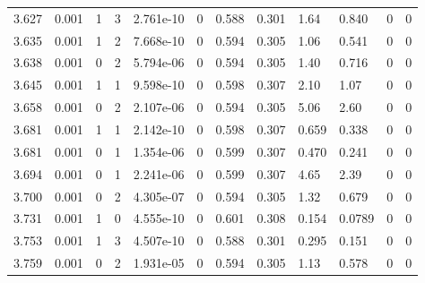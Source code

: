 \documentclass[preview]{standalone}
\begin{document}
{{{{{{{{\begin{tabular}{L{1.2cm}C{1.2cm} C{0.3cm}C{0.5cm} C{1.4cm}C{1.4cm} C{1.4cm}C{1.4cm} C{1.6cm}C{1.6cm} C{1.6cm}C{1.6cm}}
  3.627  &  0.001  & 1     &  3 &  2.761e-10  & 0  &  0.588&   0.301& 1.64 & 0.840   &  0 & 0  \\ 
  3.635  &  0.001  & 1     &  2 &  7.668e-10  & 0  &  0.594&   0.305& 1.06 & 0.541   &  0 & 0  \\ 
  3.638  &  0.001  & 0     &  2 &  5.794e-06  & 0  &  0.594&   0.305& 1.40 & 0.716   &  0 & 0  \\ 
  3.645  &  0.001  & 1     &  1 &  9.598e-10  & 0  &  0.598&   0.307& 2.10 & 1.07   &  0 & 0  \\ 
  3.658  &  0.001  & 0     &  2 &  2.107e-06  & 0  &  0.594&   0.305& 5.06 & 2.60   &  0 & 0  \\ 
  3.681  &  0.001  & 1     &  1 &  2.142e-10  & 0  &  0.598&   0.307& 0.659 & 0.338   &  0 & 0  \\ 
  3.681  &  0.001  & 0     &  1 &  1.354e-06  & 0  &  0.599&   0.307& 0.470 & 0.241   &  0 & 0  \\ 
  3.694  &  0.001  & 0     &  1 &  2.241e-06  & 0  &  0.599&   0.307& 4.65 & 2.39   &  0 & 0  \\ 
  3.700  &  0.001  & 0     &  2 &  4.305e-07  & 0  &  0.594&   0.305& 1.32 & 0.679   &  0 & 0  \\ 
  3.731  &  0.001  & 1     &  0 &  4.555e-10  & 0  &  0.601&   0.308& 0.154 & 0.0789   &  0 & 0  \\ 
  3.753  &  0.001  & 1     &  3 &  4.507e-10  & 0  &  0.588&   0.301& 0.295 & 0.151   &  0 & 0  \\ 
  3.759  &  0.001  & 0     &  2 &  1.931e-05  & 0  &  0.594&   0.305& 1.13 & 0.578   &  0 & 0  \\ 
\hline 
\end{tabular} 

}}}}}}}}
\end{document}
